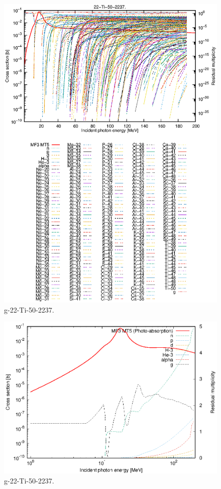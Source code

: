 \begin{figure}
 \includegraphics[width=\linewidth]{eps/g_22-Ti-50_2237.eps}
  \caption{g-22-Ti-50-2237.}
\end{figure}
\newpage \clearpage

\begin{figure}
 \includegraphics[width=\linewidth]{eps-log/g_22-Ti-50_2237.eps}
 \caption{g-22-Ti-50-2237.}
\end{figure}
\newpage \clearpage


